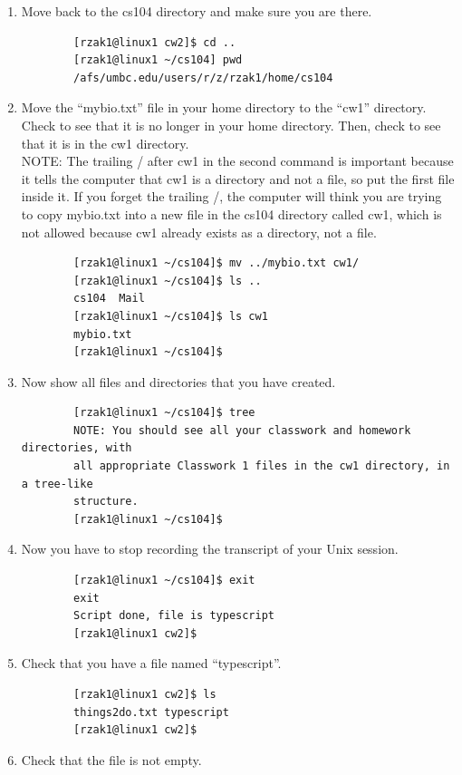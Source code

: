 \documentclass[letter,11pt]{article}
\begin{document}
\begin{enumerate}
    \item Move back to the cs104 directory and make sure you are there.
    \begin{verbatim}
        [rzak1@linux1 cw2]$ cd ..
        [rzak1@linux1 ~/cs104] pwd
        /afs/umbc.edu/users/r/z/rzak1/home/cs104
    \end{verbatim}
    \item Move the ``mybio.txt'' file in your home directory to the ``cw1'' directory. Check to see that it is no longer in your home directory. Then, check to see that it is in the cw1 directory. \\
    NOTE: The trailing / after cw1 in the second command is important because it tells the computer that cw1 is a directory and not a file, so put the first file inside it. If you forget the trailing /, the computer will think you are trying to copy mybio.txt into a new file in the cs104 directory called cw1, which is not allowed because cw1 already exists as a directory, not a file.
    \begin{verbatim}
        [rzak1@linux1 ~/cs104]$ mv ../mybio.txt cw1/
        [rzak1@linux1 ~/cs104]$ ls ..
        cs104  Mail
        [rzak1@linux1 ~/cs104]$ ls cw1
        mybio.txt
        [rzak1@linux1 ~/cs104]$
    \end{verbatim}
    \item Now show all files and directories that you have created.
    \begin{verbatim}
        [rzak1@linux1 ~/cs104]$ tree
        NOTE: You should see all your classwork and homework directories, with
        all appropriate Classwork 1 files in the cw1 directory, in a tree-like
        structure.
        [rzak1@linux1 ~/cs104]$
    \end{verbatim}
    \item Now you have to stop recording the transcript of your Unix session.
    \begin{verbatim}
        [rzak1@linux1 ~/cs104]$ exit
        exit
        Script done, file is typescript
        [rzak1@linux1 cw2]$
    \end{verbatim}
    \item Check that you have a file named ``typescript''.
    \begin{verbatim}
        [rzak1@linux1 cw2]$ ls
        things2do.txt typescript
        [rzak1@linux1 cw2]$
    \end{verbatim}
    \item Check that the file is not empty.
    \begin{verbatim}

\end{verbatim}
\end{enumerate}
\end{document}
